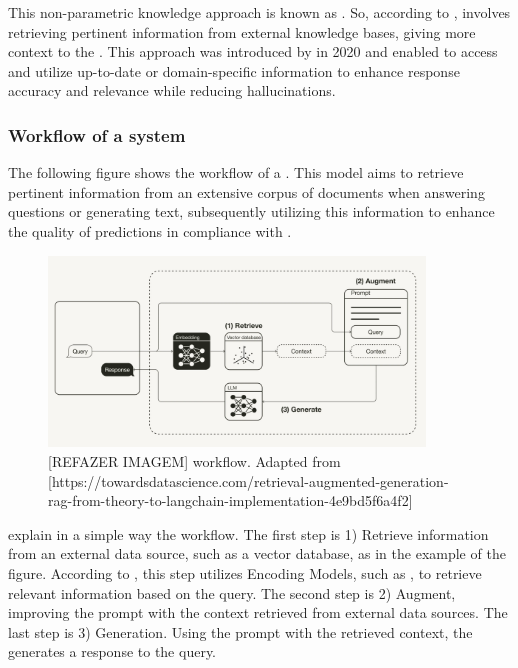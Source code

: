 This non-parametric knowledge approach is known as {\rag}. So, according to \citet{gao_retrieval-augmented_2023}, {\rag} involves retrieving pertinent information from external knowledge bases, giving more context to the {\llm}. This approach was introduced by \citet{lewis_retrieval-augmented_2020} in 2020 and enabled {\llm} to access and utilize up-to-date or domain-specific information to enhance response accuracy and relevance while reducing hallucinations.


\subsubsection{Workflow of a {\rag} system}

The following figure shows the workflow of a {\rag}. This model aims to retrieve pertinent information from an extensive corpus of documents when answering questions or generating text, subsequently utilizing this information to enhance the quality of predictions in compliance with \citet{lewis_retrieval-augmented_2020}.

\begin{figure}[ht]
    \includegraphics[width=10cm]{figs/chapter2/rag_workflow.png}
    \centering
    \caption{[REFAZER IMAGEM] {\rag} workflow. Adapted from [https://towardsdatascience.com/retrieval-augmented-generation-rag-from-theory-to-langchain-implementation-4e9bd5f6a4f2]}
\end{figure}

\citet{gao_retrieval-augmented_2023} explain in a simple way the workflow. The first step is 1) Retrieve information from an external data source, such as a vector database, as in the example of the figure. According to \citet{gao_retrieval-augmented_2023}, this step utilizes Encoding Models, such as {\bm}, to retrieve relevant information based on the query. The second step is 2) Augment, improving the {\llm} prompt with the context retrieved from external data sources. The last step is 3) Generation. Using the prompt with the retrieved context, the {\llm} generates a response to the query.


